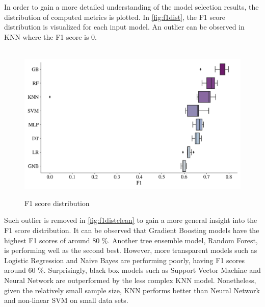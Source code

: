 \clearpage
\newpage
{}
\restoregeometry
\fancyheadoffset{0pt}

In order to gain a more detailed understanding of the model selection results, the distribution of computed metrics is plotted. In \autoref{fig:f1dist}, the F1 score distribution is visualized for each input model. An outlier can be observed in KNN where the F1 score is 0.				
\begin{figure}[H]
\centering
\caption{F1 score distribution}\vspace{0.5em}
\label{fig:f1dist}\
\includegraphics[width=140mm]{Figures/F1_Distribution.jpg}
\vspace{-1em}
\end{figure}
Such outlier is removed in \autoref{fig:f1distclean} to gain a more general insight into the F1 score distribution.
It can be observed that Gradient Boosting models have the highest F1 scores of around 80 \%.
Another tree ensemble model, Random Forest, is performing well as the second best. However, more transparent models such as Logistic Regression and Naive Bayes are performing poorly, having F1 scores around 60 \%.
Surprisingly, black box models such as Support Vector Machine and Neural Network are outperformed by the less complex KNN model.
Nonetheless, given the relatively small sample size, KNN performs better than Neural Network and non-linear SVM on small data sets.
